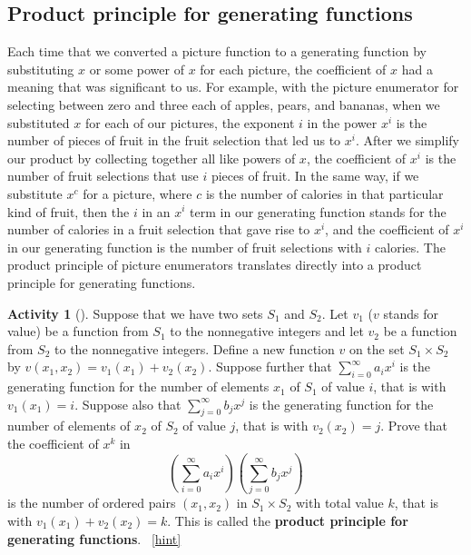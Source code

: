 \documentclass[10pt,]{book}
\newcommand{\terminology}[1]{\textbf{#1}}
\theoremstyle{plain}
\theoremstyle{definition}
\theoremstyle{definition}
\theoremstyle{definition}
\newtheorem{activity}[project]{Activity}
\numberwithin{equation}{chapter}
\begin{document}
\subsection[{Product principle for generating functions}]{Product principle for generating functions}\label{subsection-23}
\hypertarget{p-881}{}%
Each time that we converted a picture function to a generating function by substituting \(x\) or some power of \(x\) for each picture, the coefficient of \(x\) had a meaning that was significant to us. For example, with the picture enumerator for selecting between zero and three each of apples, pears, and bananas, when we substituted \(x\) for each of our pictures, the exponent \(i\) in the power \(x^i\) is the number of pieces of fruit in the fruit selection that led us to \(x^i\). After we simplify our product by collecting together all like powers of \(x\), the coefficient of \(x^i\) is the number of fruit selections that use \(i\) pieces of fruit. In the same way, if we substitute \(x^c\) for a picture, where \(c\) is the number of calories in that particular kind of fruit, then the \(i\) in an \(x^i\) term in our generating function stands for the number of calories in a fruit selection that gave rise to \(x^i\), and the coefficient of \(x^i\) in our generating function is the number of fruit selections with \(i\) calories.  The product principle of picture enumerators translates directly into a product principle for generating functions.%
\begin{activity}[]\label{ProductPrincipleOGF}
\hypertarget{p-882}{}%
Suppose that we have two sets \(S_1\) and \(S_2\). Let \(v_1\) (\(v\) stands for value) be a function from \(S_1\) to the nonnegative integers and let \(v_2\) be a function from \(S_2\) to the nonnegative integers.  Define a new function \(v\) on the set \(S_1 \times S_2\) by \(v(x_1,x_2) = v_1(x_1) +v_2(x_2)\). Suppose further that \(\sum_{i=0}^\infty a_ix^i\) is the generating function for the number of elements \(x_1\) of \(S_1\) of value \(i\), that is with \(v_1(x_1)=i\). Suppose also that \(\sum_{j=0}^\infty b_j x^j\) is the generating function for the number of elements of \(x_2\) of \(S_2\) of value \(j\), that is with \(v_2(x_2) = j\).  Prove that the coefficient of \(x^k\) in%
\begin{equation*}
\left(\sum_{i=0}^\infty a_ix^i\right)\left(\sum_{j=0}^\infty
b_jx^j\right)
\end{equation*}
is the number of ordered pairs \((x_1,x_2)\) in \(S_1\times S_2\) with total value \(k\), that is with \(v_1(x_1) +v_2(x_2) =k\). This is called the \terminology{product principle for generating functions}.%
~\hfill{\tiny\hyperlink{a-187}{[hint]}\hypertarget{q-187}{}}\end{activity}
\end{document}
